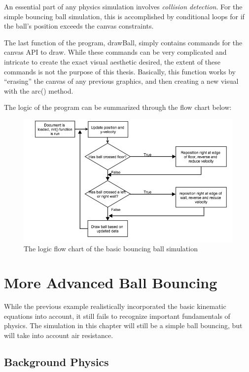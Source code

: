 An essential part of any physics simulation involves \textit{collision detection}.  For the simple bouncing ball simulation, this is accomplished by conditional loops for if the ball's position exceeds the canvas constraints.  


The last function of the program, drawBall, simply contains commands for the canvas API to draw.  While these commands can be very complicated and intricate to create the exact visual aesthetic desired, the extent of these commands is not the purpose of this thesis.  Basically, this function works by ``erasing'' the canvas of any previous graphics, and then creating a new visual with the arc() method.   

The logic of the program can be summarized through the flow chart below:


\begin{figure}[h] 
	\centering
		\includegraphics[width=15cm]{Figures/basicbouncingball.png}

	\caption{The logic flow chart of the basic bouncing ball simulation}
	\label{fig:basicbouncingball}
\end{figure}




\section{More Advanced Ball Bouncing}

While the previous example realistically incorporated the basic kinematic equations into account, it still fails to recognize important fundamentals of physics.  The simulation in this chapter will still be a simple ball bouncing, but will take into account air resistance.

\subsection{Background Physics}

